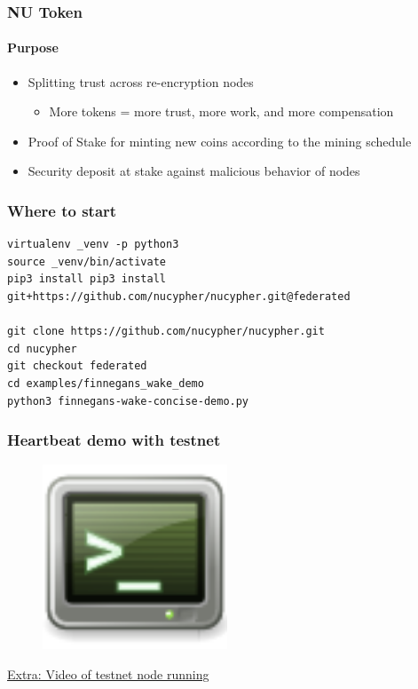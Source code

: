 \documentclass[xetex,mathsans,sans,aspectratio=169]{beamer}
\begin{document}
    \begin{frame}
        \frametitle{NU Token}
        \framesubtitle{Purpose}
        \begin{itemize}
            \item Splitting trust across re-encryption nodes
            \begin{itemize}
              \item More tokens = more trust, more work, and more compensation
            \end{itemize}
            \item Proof of Stake for minting new coins according to the mining schedule
            \item Security deposit at stake against malicious behavior of nodes
        \end{itemize}
    \end{frame}

    \begin{frame}[fragile]
        \frametitle{Where to start}
        \begin{verbatim}
virtualenv _venv -p python3
source _venv/bin/activate
pip3 install pip3 install git+https://github.com/nucypher/nucypher.git@federated

git clone https://github.com/nucypher/nucypher.git
cd nucypher
git checkout federated
cd examples/finnegans_wake_demo
python3 finnegans-wake-concise-demo.py
        \end{verbatim}
    \end{frame}

    \begin{frame}
        \frametitle{Heartbeat demo with testnet}
        \begin{figure}
            \centering
            \includegraphics[height=5.5cm]{pdf/terminal.pdf}
        \end{figure}
        \href{run:videos/nucypher-node.mp4}{Extra: Video of testnet node running}
    \end{frame}
\end{document}
